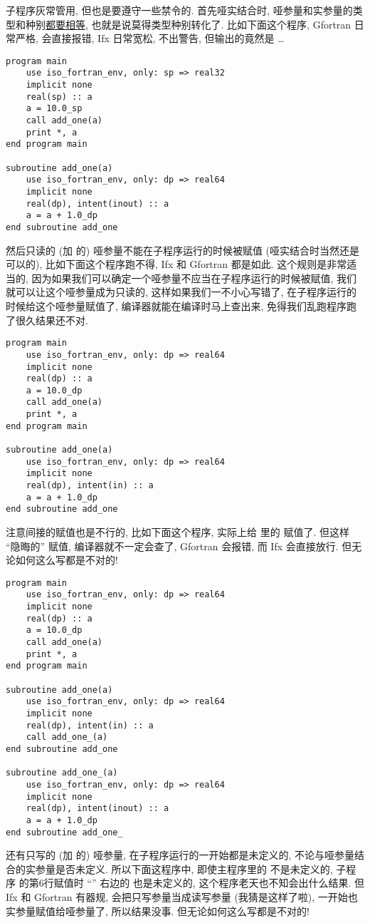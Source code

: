 子程序灰常管用, 但也是要遵守一些禁令的. 首先哑实结合时, 哑参量和实参量的类型和种别\uline{都要相等}, 也就是说莫得类型种别转化了. 比如下面这个程序, Gfortran 日常严格, 会直接报错, Ifx 日常宽松, 不出警告, 但输出的竟然是 \dots{}
\begin{lstlisting} 
program main
    use iso_fortran_env, only: sp => real32
    implicit none
    real(sp) :: a
    a = 10.0_sp
    call add_one(a)
    print *, a
end program main

subroutine add_one(a)
    use iso_fortran_env, only: dp => real64
    implicit none
    real(dp), intent(inout) :: a
    a = a + 1.0_dp
end subroutine add_one
\end{lstlisting} 
然后只读的 (加  的) 哑参量不能在子程序运行的时候被赋值 (哑实结合时当然还是可以的), 比如下面这个程序跑不得, Ifx 和 Gfortran 都是如此. 这个规则是非常适当的, 因为如果我们可以确定一个哑参量不应当在子程序运行的时候被赋值, 我们就可以让这个哑参量成为只读的, 这样如果我们一不小心写错了, 在子程序运行的时候给这个哑参量赋值了, 编译器就能在编译时马上查出来, 免得我们乱跑程序跑了很久结果还不对. 
\begin{lstlisting} 
program main
    use iso_fortran_env, only: dp => real64
    implicit none
    real(dp) :: a
    a = 10.0_dp
    call add_one(a)
    print *, a
end program main

subroutine add_one(a)
    use iso_fortran_env, only: dp => real64
    implicit none
    real(dp), intent(in) :: a
    a = a + 1.0_dp
end subroutine add_one
\end{lstlisting} 
注意间接的赋值也是不行的, 比如下面这个程序,  实际上给  里的  赋值了. 但这样 ``隐晦的'' 赋值, 编译器就不一定会查了, Gfortran 会报错, 而 Ifx 会直接放行. 但无论如何这么写都是不对的!\label{secret_assignment} 
\begin{lstlisting} 
program main
    use iso_fortran_env, only: dp => real64
    implicit none
    real(dp) :: a
    a = 10.0_dp
    call add_one(a)
    print *, a
end program main

subroutine add_one(a)
    use iso_fortran_env, only: dp => real64
    implicit none
    real(dp), intent(in) :: a
    call add_one_(a)
end subroutine add_one

subroutine add_one_(a)
    use iso_fortran_env, only: dp => real64
    implicit none
    real(dp), intent(inout) :: a
    a = a + 1.0_dp
end subroutine add_one_
\end{lstlisting} 
还有只写的 (加  的) 哑参量, 在子程序运行的一开始都是未定义的, 不论与哑参量结合的实参量是否未定义. 所以下面这程序中, 即使主程序里的  不是未定义的, 子程序  的第6行赋值时 ``\ttt{=}'' 右边的  也是未定义的, 这个程序老天也不知会出什么结果. 但 Ifx 和 Gfortran 有器规, 会把只写参量当成读写参量 (我猜是这样了啦), 一开始也实参量赋值给哑参量了, 所以结果没事. 但无论如何这么写都是不对的!
